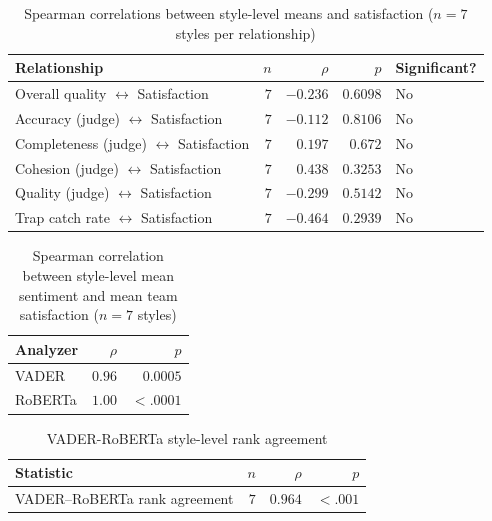 \clearpage
\begin{table}[htbp]
  \centering
  \small
  \caption{Spearman correlations between style-level means and satisfaction ($n=7$ styles per relationship)}
  \label{tab:03-style-correlations}
\begin{tabular}{l r r r l}
    \toprule
    Relationship & $n$ & $\rho$ & $p$ & Significant? \\
    \midrule
    Overall quality  $\leftrightarrow$  Satisfaction & $7$ & $-0.236$ & $0.6098$ & No \\
    Accuracy (judge)  $\leftrightarrow$  Satisfaction & $7$ & $-0.112$ & $0.8106$ & No \\
    Completeness (judge)  $\leftrightarrow$  Satisfaction & $7$ & $0.197$ & $0.672$ & No \\
    Cohesion (judge)  $\leftrightarrow$  Satisfaction & $7$ & $0.438$ & $0.3253$ & No \\
    Quality (judge)  $\leftrightarrow$  Satisfaction & $7$ & $-0.299$ & $0.5142$ & No \\
    Trap catch rate  $\leftrightarrow$  Satisfaction & $7$ & $-0.464$ & $0.2939$ & No \\
    \bottomrule
\end{tabular}%
\end{table}

\begin{table}[htbp]
  \centering
  \small
  \caption{Spearman correlation between style-level mean sentiment and mean team satisfaction ($n=7$ styles)}
  \label{tab:03-sentiment-satisfaction-correlation}
\begin{tabular}{lrr}
    \toprule
    Analyzer & $\rho$ & $p$ \\
    \midrule
    VADER & $0.96$ & $0.0005$ \\
    RoBERTa & $1.00$ & $< .0001$ \\
    \bottomrule
\end{tabular}%
\end{table}

\begin{table}[htbp]
  \centering
  \small
  \caption{\ac{VADER}-\ac{RoBERTa} style-level rank agreement}
  \label{tab:03-vader-roberta-agreement}
\begin{tabular}{l r r r}
    \toprule
    Statistic & $n$ & $\rho$ & $p$ \\
    \midrule
    VADER–RoBERTa rank agreement & $7$ & $0.964$ & $< .001$ \\
    \bottomrule
\end{tabular}%
\end{table}

